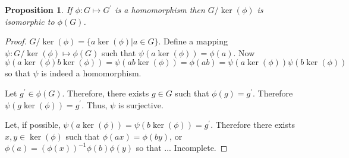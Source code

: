\documentclass{article}
\theoremstyle{plain}
\numberwithin{thm}{section}
\theoremstyle{plain}
\newtheorem{prop}{Proposition}
\numberwithin{prop}{section}
\theoremstyle{definition}
\numberwithin{defn}{section}
\theoremstyle{remark}
\numberwithin{equation}{section}
\begin{document}
\begin{prop}\label{s6p7}
If $\phi:G \mapsto G^\prime$ is a homomorphism then $G/\ker(\phi)$ is 
isomorphic to $\phi(G)$.
\end{prop}
\begin{proof}
$G/\ker(\phi) = \{a\ker(\phi)| a \in G\}$. Define a mapping $\psi:G/\ker(\phi)
\mapsto \phi(G)$ such that $\psi(a\ker(\phi)) = \phi(a)$. Now $\psi(a\ker(\phi)
b\ker(\phi)) = \psi(ab\ker(\phi)) = \phi(ab) = 
\psi(a\ker(\phi))\psi(b\ker(\phi)) $ so that $\psi$ is indeed a homomorphism.

Let $g^\prime \in \phi(G)$. Therefore, there exists $g \in G$ such that 
$\phi(g) = g^\prime$. Therefore $\psi(g\ker(\phi)) = g^\prime$. Thus, $\psi$
is surjective.

Let, if possible, $\psi(a\ker(\phi)) = \psi(b\ker(\phi)) = g^\prime$. Therefore
there exists $x, y \in \ker(\phi)$ such that $\phi(ax) = \phi(by)$, or $\phi(a)
= (\phi(x))^{-1}\phi(b)\phi(y)$ so that ...
{\color{red}Incomplete.}
\end{proof}
\nocite{*}


\end{document}
